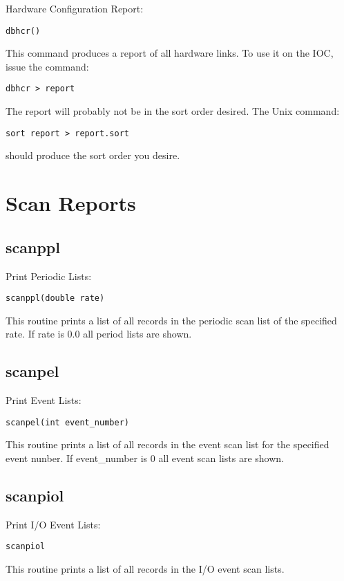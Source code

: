 Hardware Configuration Report:

\begin{verbatim}dbhcr()
\end{verbatim}This command produces a report of all hardware links. To use it on the IOC, issue the command:

\begin{verbatim}dbhcr > report
\end{verbatim}The report will probably not be in the sort order desired. The Unix command:

\begin{verbatim}sort report > report.sort
\end{verbatim}should produce the sort order you desire.

\section{Scan Reports}

\subsection{scanppl}

Print Periodic Lists:

\begin{verbatim}scanppl(double rate)
\end{verbatim}This routine prints a list of all records in the periodic scan list of the specified rate. If rate is 0.0 all period lists are shown.

\subsection{scanpel}

Print Event Lists:

\begin{verbatim}scanpel(int event_number)
\end{verbatim}This routine prints a list of all records in the event scan list for the specified event nunber. If event\_number is 0 all event 
scan lists are shown.

\subsection{scanpiol}

Print I/O Event Lists:

\begin{verbatim}scanpiol
\end{verbatim}This routine prints a list of all records in the I/O event scan lists.


